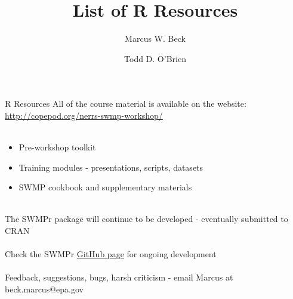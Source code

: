 \documentclass[xcolor=svgnames]{beamer}\usepackage[]{graphicx}\usepackage[]{color}
\begin{document}
\title[R Resources]{List of R Resources}

\author[M. Beck, T. O'Brien]{Marcus W. Beck \and Todd D. O'Brien}

\date{}







\begin{frame}[t]{R Resources}
All of the course material is available on the website: \href{http://copepod.org/nerrs-swmp-workshop/}{http://copepod.org/nerrs-swmp-workshop/}\\~\\

\begin{itemize}
\item Pre-workshop toolkit
\item Training modules - presentations, scripts, datasets
\item SWMP cookbook and supplementary materials \\~\\
\end{itemize}

The SWMPr package will continue to be developed - eventually submitted to CRAN \\
~\\
Check the SWMPr \href{https://github.com/fawda123/SWMPr}{GitHub page} for ongoing development \\~\\
Feedback, suggestions, bugs, harsh criticism - email Marcus at beck.marcus@epa.gov
\end{frame}
\end{document}

